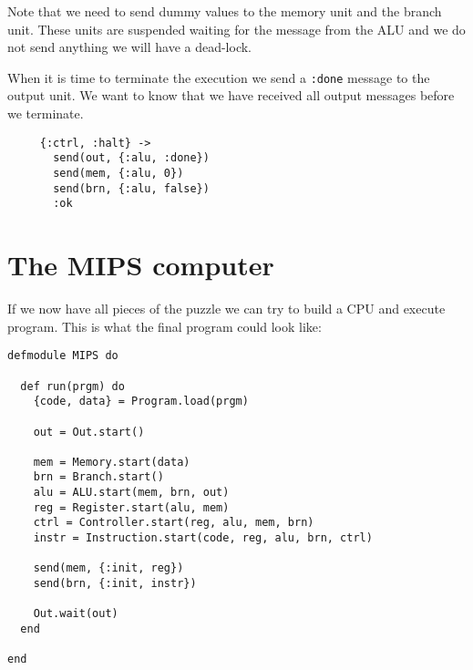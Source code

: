 \documentclass[a4paper,11pt]{article}
\begin{document}
Note that we need to send dummy values to the memory unit and the
branch unit. These units are suspended waiting for the message from the
ALU and we do not send anything we will have a dead-lock.


When it is time to terminate the execution we send a {\tt :done}
message to the output unit. We want to know that we have received all
output messages before we terminate.

\begin{verbatim}
     {:ctrl, :halt} ->
       send(out, {:alu, :done})
       send(mem, {:alu, 0})		
       send(brn, {:alu, false})
       :ok
\end{verbatim}

\section*{The MIPS computer}

If we now have all pieces of the puzzle we can try to build a CPU and
execute program. This is what the final program could look like:


\begin{verbatim}
defmodule MIPS do

  def run(prgm) do
    {code, data} = Program.load(prgm)

    out = Out.start()

    mem = Memory.start(data)
    brn = Branch.start()
    alu = ALU.start(mem, brn, out)
    reg = Register.start(alu, mem)
    ctrl = Controller.start(reg, alu, mem, brn)
    instr = Instruction.start(code, reg, alu, brn, ctrl)

    send(mem, {:init, reg})
    send(brn, {:init, instr})

    Out.wait(out)
  end

end
\end{verbatim}
\end{document}
